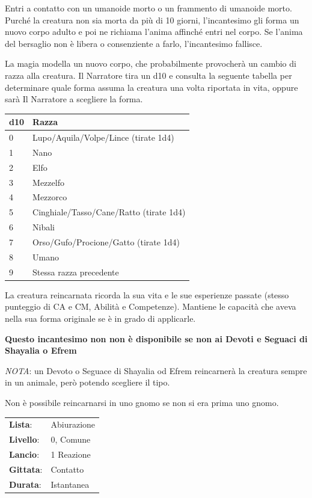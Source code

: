 \begin{multicols}{2}
Entri a contatto con un umanoide morto o un frammento di umanoide morto. Purché la creatura non sia morta da più di 10 giorni, l'incantesimo gli forma un nuovo corpo adulto e poi ne richiama l'anima affinché entri nel corpo. Se l'anima del bersaglio non è libera o consenziente a farlo, l'incantesimo fallisce.

La magia modella un nuovo corpo, che probabilmente provocherà un cambio di razza alla creatura. Il Narratore tira un d10 e consulta la seguente tabella per determinare quale forma assuma la creatura una volta riportata in vita, oppure sarà Il Narratore a scegliere la forma.

\medskip

\noindent\begin{tabular}{ll}
	\toprule
 \rowcolor{gray!20}\textbf{d10} &\textbf{Razza}\\
	\toprule
	0 & Lupo/Aquila/Volpe/Lince (tirate 1d4)\\
 \rowcolor{gray!20}1&Nano\\
	2&Elfo\\
 \rowcolor{gray!20}3&Mezzelfo\\
	4&Mezzorco\\
 \rowcolor{gray!20}5&Cinghiale/Tasso/Cane/Ratto (tirate 1d4)\\
	6&Nibali\\
 \rowcolor{gray!20}7&Orso/Gufo/Procione/Gatto (tirate 1d4)\\
	8&Umano\\
 \rowcolor{gray!20}9&Stessa razza precedente
\end{tabular}

\medskip

La creatura reincarnata ricorda la sua vita e le sue esperienze passate (stesso punteggio di CA e CM, Abilità e Competenze). Mantiene le capacità che aveva nella sua forma originale se è in grado di applicarle.

\textbf{Questo incantesimo non non è disponibile se non ai Devoti e Seguaci di Shayalia o Efrem}

\emph{NOTA}: un Devoto o Seguace di Shayalia od Efrem reincarnerà la creatura sempre in un animale, però potendo scegliere il tipo.

Non è possibile reincarnarsi in uno gnomo se non si era prima uno gnomo.

\noindent\begin{tabularx}{\linewidth}{p{1.3cm}X}
	\rowcolor{gray!20}\textbf{Lista}: & Abiurazione \\
	\textbf{Livello}: & 0, Comune \\
	\rowcolor{gray!20}\textbf{Lancio}: & 1 Reazione \\
	\textbf{Gittata}: & Contatto \\
	\rowcolor{gray!20}\textbf{Durata}: & Istantanea \\
\end{tabularx}\smallskip


\end{multicols}
